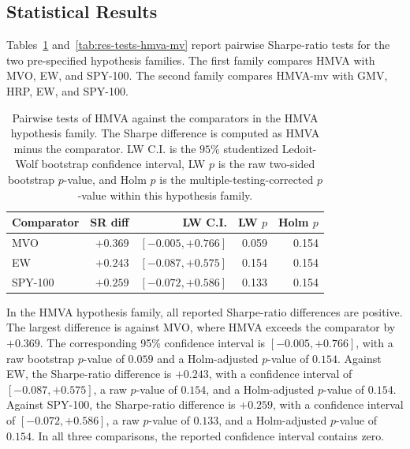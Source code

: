 \documentclass[12pt]{article}
\begin{document}
\subsection{Statistical Results}
\label{sec:res-tests}

Tables~\ref{tab:res-tests-hmva} and~\ref{tab:res-tests-hmva-mv} report pairwise Sharpe-ratio tests for the two pre-specified hypothesis families. The first family compares HMVA with MVO, EW, and SPY-100. The second family compares HMVA-mv with GMV, HRP, EW, and SPY-100.

\begin{table}[!ht]
\centering
\caption{Pairwise tests of HMVA against the comparators in the HMVA hypothesis family. The Sharpe difference is computed as HMVA minus the comparator. LW C.I. is the $95\%$ studentized Ledoit-Wolf bootstrap confidence interval, LW $p$ is the raw two-sided bootstrap $p$-value, and Holm $p$ is the multiple-testing-corrected $p$-value within this hypothesis family.}
\label{tab:res-tests-hmva}
\begin{tabular}{lrrrr}
\toprule
Comparator & SR diff & LW C.I. & LW $p$ & Holm $p$\\
\midrule
MVO  & $+0.369$ & $[-0.005, +0.766]$ & 0.059 & 0.154\\
EW      & $+0.243$ & $[-0.087, +0.575]$ & 0.154 & 0.154\\
SPY-100 & $+0.259$ & $[-0.072, +0.586]$ & 0.133 & 0.154\\
\bottomrule
\end{tabular}
\end{table}

In the HMVA hypothesis family, all reported Sharpe-ratio differences are positive. The largest difference is against MVO, where HMVA exceeds the comparator by $+0.369$. The corresponding 95\% confidence interval is $[-0.005,+0.766]$, with a raw bootstrap $p$-value of $0.059$ and a Holm-adjusted $p$-value of $0.154$. Against EW, the Sharpe-ratio difference is $+0.243$, with a confidence interval of $[-0.087,+0.575]$, a raw $p$-value of $0.154$, and a Holm-adjusted $p$-value of $0.154$. Against SPY-100, the Sharpe-ratio difference is $+0.259$, with a confidence interval of $[-0.072,+0.586]$, a raw $p$-value of $0.133$, and a Holm-adjusted $p$-value of $0.154$. In all three comparisons, the reported confidence interval contains zero.
\end{document}
